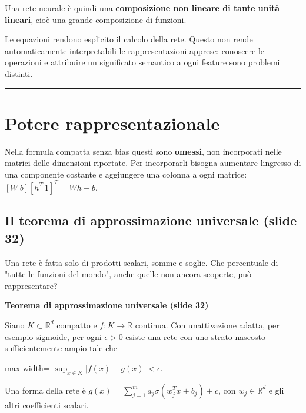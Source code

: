 \documentclass[11pt,a4paper,oneside,openany]{book}
\renewenvironment{quote}{\list{}{\leftmargin=1em\rightmargin=0pt}\item\relax}{\endlist}
\begin{document}
Una rete neurale è quindi una \textbf{composizione non lineare di tante unità lineari}, cioè una grande composizione di funzioni.

Le equazioni rendono esplicito il calcolo della rete. Questo non rende automaticamente interpretabili le rappresentazioni apprese: conoscere le operazioni e attribuire un significato semantico a ogni feature sono problemi distinti.

\begin{center}\rule{0.5\linewidth}{0.5pt}\end{center}

\section{Potere rappresentazionale}\label{f01-r487}

Nella formula compatta senza bias questi sono \textbf{omessi}, non incorporati nelle matrici delle dimensioni riportate. Per incorporarli bisogna aumentare l\textquotesingle ingresso di una componente costante e aggiungere una colonna a ogni matrice: \([W\ b][h^T\ 1]^T=Wh+b\).

\subsection{Il teorema di approssimazione universale (slide 32)}\label{f01-r491}

Una rete è fatta solo di prodotti scalari, somme e soglie. Che percentuale di "tutte le funzioni del mondo", anche quelle non ancora scoperte, può rappresentare?

\begin{quote}
\textbf{Teorema di approssimazione universale (slide 32)}
\end{quote}

\begin{quote}
Siano \(K\subset\mathbb{R}^d\) compatto e \(f:K\to\mathbb{R}\) continua. Con un\textquotesingle attivazione adatta, per esempio sigmoide, per ogni \(\epsilon>0\) esiste una rete con uno strato nascosto sufficientemente ampio tale che \begin{center}
\begin{adjustbox}{max width=\linewidth}
$\displaystyle \boxed{\sup_{x\in K}|f(x)-g(x)|<\epsilon.}$
\end{adjustbox}
\end{center} Una forma della rete è \(g(x)=\sum_{j=1}^{m}a_j\sigma(w_j^Tx+b_j)+c\), con \(w_j\in\mathbb{R}^d\) e gli altri coefficienti scalari.
\end{quote}
\end{document}
